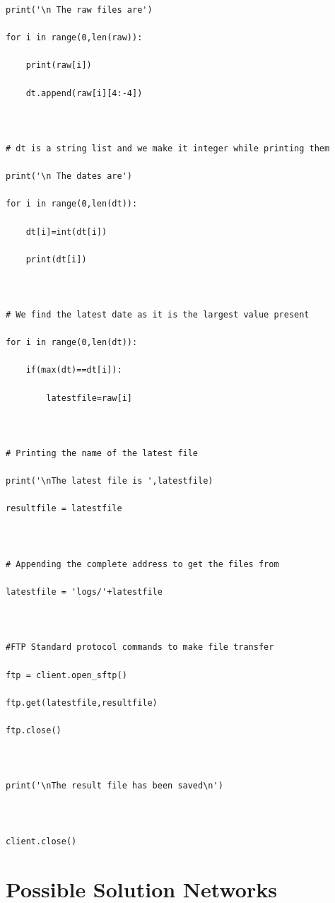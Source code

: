 \documentclass[12pt]{report}
\begin{document}
\begin{verbatim}
print('\n The raw files are')

for i in range(0,len(raw)):

    print(raw[i])

    dt.append(raw[i][4:-4])



# dt is a string list and we make it integer while printing them

print('\n The dates are')

for i in range(0,len(dt)):

    dt[i]=int(dt[i])

    print(dt[i])



# We find the latest date as it is the largest value present

for i in range(0,len(dt)):

    if(max(dt)==dt[i]):

        latestfile=raw[i]



# Printing the name of the latest file

print('\nThe latest file is ',latestfile)

resultfile = latestfile



# Appending the complete address to get the files from

latestfile = 'logs/'+latestfile



#FTP Standard protocol commands to make file transfer

ftp = client.open_sftp()

ftp.get(latestfile,resultfile)

ftp.close()



print('\nThe result file has been saved\n')



client.close()
\end{verbatim}

\chapter{Possible Solution Networks}
\end{document}
